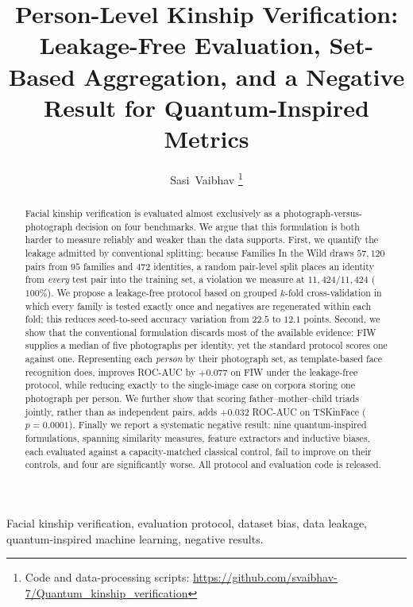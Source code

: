 \documentclass[journal,12pt]{IEEEtran}
\begin{document}
\title{Person-Level Kinship Verification: Leakage-Free Evaluation, Set-Based
Aggregation, and a Negative Result for Quantum-Inspired Metrics}

\author{Sasi~Vaibhav%
\thanks{Code and data-processing scripts:
\url{https://github.com/svaibhav-7/Quantum_kinship_verification}}}

\maketitle

\begin{abstract}
Facial kinship verification is evaluated almost exclusively as a
photograph-versus-photograph decision on four benchmarks. We argue that this
formulation is both harder to measure reliably and weaker than the data
supports. First, we quantify the leakage admitted by conventional splitting:
because Families In the Wild draws $57{,}120$ pairs from $95$ families and
$472$ identities, a random pair-level split places an identity from
\emph{every} test pair into the training set, a violation we measure at
$11{,}424/11{,}424$ ($100\%$). We propose a leakage-free protocol based on
grouped $k$-fold cross-validation in which every family is tested exactly once
and negatives are regenerated within each fold; this reduces seed-to-seed
accuracy variation from $22.5$ to $12.1$ points. Second, we show that the
conventional formulation discards most of the available evidence: FIW supplies
a median of five photographs per identity, yet the standard protocol scores one
against one. Representing each \emph{person} by their photograph set, as
template-based face recognition does, improves ROC-AUC by $+0.077$ on FIW under
the leakage-free protocol, while reducing exactly to the single-image case on
corpora storing one photograph per person. We further show that scoring
father--mother--child triads jointly, rather than as independent pairs, adds
$+0.032$ ROC-AUC on TSKinFace ($p = 0.0001$). Finally we report a systematic
negative result: nine quantum-inspired formulations, spanning similarity
measures, feature extractors and inductive biases, each evaluated against a
capacity-matched classical control, fail to improve on their controls, and four
are significantly worse. All protocol and evaluation code is released.
\end{abstract}

\begin{IEEEkeywords}
Facial kinship verification, evaluation protocol, dataset bias, data leakage,
quantum-inspired machine learning, negative results.
\end{IEEEkeywords}
\end{document}
